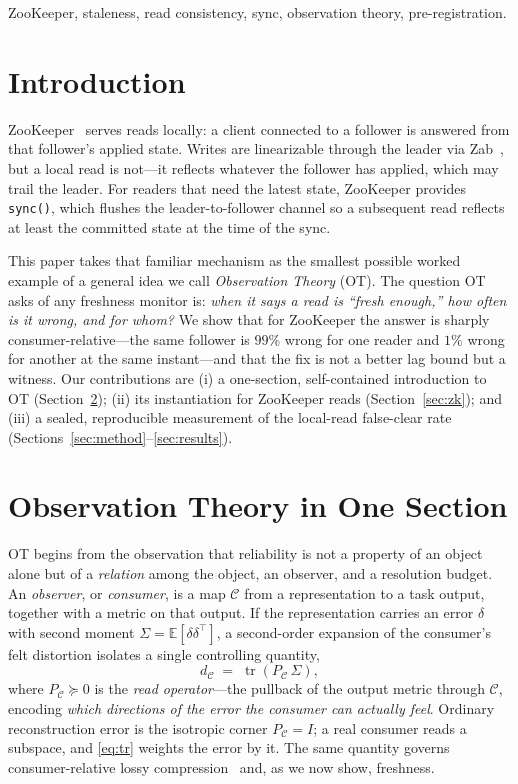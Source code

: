 \documentclass[conference]{IEEEtran}
\newcommand{\PC}{P_{\mathcal{C}}}
\newcommand{\tr}{\operatorname{tr}}
\begin{document}
\begin{IEEEkeywords}
ZooKeeper, staleness, read consistency, sync, observation theory, pre-registration.
\end{IEEEkeywords}

\section{Introduction}
ZooKeeper~\cite{hunt2010zookeeper} serves reads locally: a client connected to a
follower is answered from that follower's applied state. Writes are linearizable
through the leader via Zab~\cite{junqueira2011zab}, but a local read is not---it
reflects whatever the follower has applied, which may trail the leader. For
readers that need the latest state, ZooKeeper provides \texttt{sync()}, which
flushes the leader-to-follower channel so a subsequent read reflects at least the
committed state at the time of the sync.

This paper takes that familiar mechanism as the smallest possible worked example
of a general idea we call \emph{Observation Theory} (OT). The question OT asks of
any freshness monitor is: \emph{when it says a read is ``fresh enough,'' how often
is it wrong, and for whom?} We show that for ZooKeeper the answer is sharply
consumer-relative---the same follower is $99\%$ wrong for one reader and $1\%$
wrong for another at the same instant---and that the fix is not a better lag bound
but a witness. Our contributions are (i) a one-section, self-contained
introduction to OT (Section~\ref{sec:ot}); (ii) its instantiation for ZooKeeper
reads (Section~\ref{sec:zk}); and (iii) a sealed, reproducible measurement of the
local-read false-clear rate (Sections~\ref{sec:method}--\ref{sec:results}).

\section{Observation Theory in One Section}\label{sec:ot}
OT begins from the observation that reliability is not a property of an object
alone but of a \emph{relation} among the object, an observer, and a resolution
budget. An \emph{observer}, or \emph{consumer}, is a map $\mathcal{C}$ from a
representation to a task output, together with a metric on that output. If the
representation carries an error $\delta$ with second moment $\Sigma=\mathbb{E}[\delta\delta^\top]$,
a second-order expansion of the consumer's felt distortion isolates a single
controlling quantity,
\begin{equation}\label{eq:tr}
d_{\mathcal{C}} \;=\; \tr\!\left(\PC\,\Sigma\right),
\end{equation}
where $\PC\succeq0$ is the \emph{read operator}---the pullback of the output
metric through $\mathcal{C}$, encoding \emph{which directions of the error the
consumer can actually feel}. Ordinary reconstruction error is the isotropic
corner $\PC=I$; a real consumer reads a subspace, and \eqref{eq:tr} weights the
error by it. The same quantity governs consumer-relative lossy
compression~\cite{bond_turboquant} and, as we now show, freshness.
\end{document}
